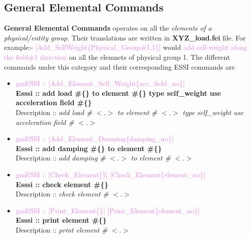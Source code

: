 \documentclass[11pt]{article}
\begin{document}
\subsection{General Elemental Commands}


\textbf{General Elemental Commands} operates on all the \textit{elements of a physical/entity group}. Their translations are written in \textbf{XYZ\_load.fei} file. For example:- \textcolor{violet}{[Add\_SelfWeight\{Physical\_Group\#1,1\}]} would \textcolor{violet}{add self-weight along the field\#1 direction} on all the elemnets of physical group 1. The different commands under this category and their corresponding ESSI commands are

  \begin{itemize}

    \item \textcolor{violet}{gmESSI :: [Add\_Element\_Self\_Weight\{acc\_field\_no\}]} \\             
    \textbf{Esssi :: add load \#\{\} to element \#\{\} type self\_weight use acceleration field \#\{\}}\\
    Description :: \textit{add load \# $<.>$ to element \# $<.>$ type self\_weight use acceleration field \# $<.>$}

    \item \textcolor{violet}{gmESSI :: [Add\_Element\_Damping\{damping\_no\}]} \\             
    \textbf{Esssi :: add damping \#\{\} to element \#\{\}}\\
    Description :: \textit{add damping \# $<.>$ to element \# $<.>$}

    \item \textcolor{violet}{gmESSI :: [Check\_Element\{\}] [Check\_Element\{element_no\}]} \\             
    \textbf{Esssi :: check element \#\{\} }\\
    Description :: \textit{check element \# $<.>$}

    \item \textcolor{violet}{gmESSI :: [Print\_Element\{\}] [Print\_Element\{element_no\}]} \\             
    \textbf{Esssi :: print element \#\{\} }\\
    Description :: \textit{print element \# $<.>$}

  \end{itemize}
\end{document}
